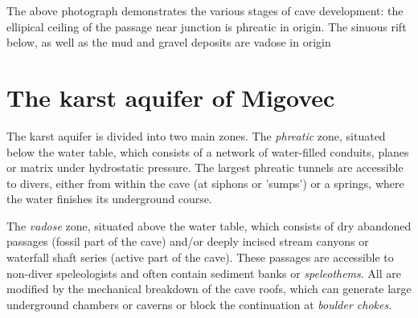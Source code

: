 \begin{marginfigure}
\caption{The above photograph demonstrates the various stages of cave development: the ellipical ceiling of the passage near  junction is phreatic in origin. The sinuous rift below, as well as the mud and gravel deposits are vadose in origin }
\label{fig:dachstein}
\end{marginfigure}

\section{The karst aquifer of Migovec} 
The karst aquifer is divided into two main zones. The \emph{phreatic} zone, situated below the water table, which consists of a network of water-filled conduits, planes or matrix under hydrostatic pressure. The largest phreatic tunnels are accessible to divers, either from within the cave (at siphons or 'sumps') or a springs, where the water finishes its underground course. 
 
 The \emph{vadose} zone, situated above the water table, which consists of dry abandoned passages (fossil part of the cave) and/or deeply incised stream canyons or waterfall shaft series (active part of the cave). These passages are accessible to non-diver speleologists and often contain sediment banks or \emph{speleothems}. All are modified by the mechanical breakdown of the cave roofs, which can generate large underground chambers or caverns or block the continuation at \emph{boulder chokes}. 


